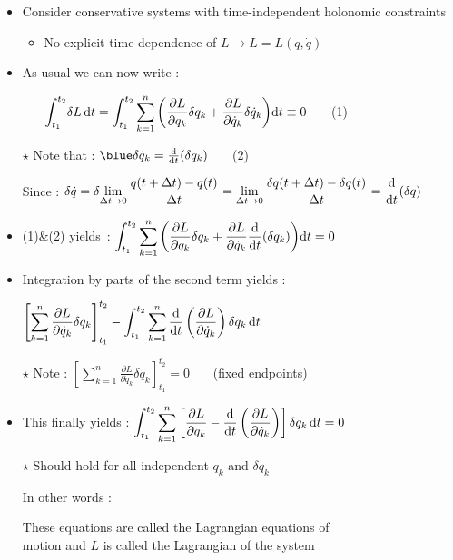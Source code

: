 \Tr
\begin{itemize}
\item Consider conservative systems with time-independent holonomic constraints
\begin{itemize}
\item No explicit time dependence of $L \rightarrow L=L(q,\dot{q})$
\end{itemize}
\item As usual we can now write :
\begin{itemize}
\item[] {\blue ${\displaystyle \int_{t_{1}}^{t_{2}}} \delta L \,{\rm d}t=
 {\displaystyle \int_{t_{1}}^{t_{2}} \sum_{k=1}^{n}
 \left( \frac{\partial L}{\partial q_{k}} \delta q_{k}
 + \frac{\partial L}{\partial \dot{q}_{k}} \delta\dot{q}_{k} \right)}
 {\rm d}t \equiv 0$} ~~~(1)
\end{itemize}
\item[$\star$] Note that : ${\blue \delta\dot{q}_{k}=\frac{{\rm d}}{{\rm d}t}(\delta q_{k})}$ ~~~(2)
\item[]  Since : $\delta \dot{q}=\delta {\displaystyle 
 \lim_{\Delta t \rightarrow 0} \frac{q(t+\Delta t)-q(t)}{\Delta t}=
 \lim_{\Delta t \rightarrow 0} \frac{\delta q(t+\Delta t)- \delta q(t)}{\Delta t}=
 \frac{{\rm d}}{{\rm d}t}(\delta q)}$
\item (1)\&(2) yields~:
 ${\displaystyle \int_{t_{1}}^{t_{2}} \sum_{k=1}^{n}
 \left( \frac{\partial L}{\partial q_{k}} \delta q_{k}
 + \frac{\partial L}{\partial \dot{q}_{k}}
 \frac{{\rm d}}{{\rm d}t}(\delta q_{k}) \right)} {\rm d}t=0$
\item Integration by parts of the second term yields :
\item[]
$\displaystyle \left[ \sum_{k=1}^{n}
 \frac{\partial L}{\partial\dot{q}_{k}}\delta q_{k} \right]_{t_{1}}^{t_{2}}
 - \int_{t_{1}}^{t_{2}} \sum_{k=1}^{n} \frac{{\rm d}}{{\rm d}t}
 \left( \frac{\partial L}{\partial\dot{q}_{k}} \right) \delta q_{k}\,{\rm d}t$
\item[$\star$] Note : 
$\displaystyle \left[ \sum_{k=1}^{n}
 \frac{\partial L}{\partial\dot{q}_{k}}\delta q_{k} \right]_{t_{1}}^{t_{2}}=0$
~~~(fixed endpoints)
\item This finally yields :
$\displaystyle \int_{t_{1}}^{t_{2}} \sum_{k=1}^{n}
 \left[ \frac{\partial L}{\partial q_{k}}
 - \frac{{\rm d}}{{\rm d}t}
 \left( \frac{\partial L}{\partial\dot{q}_{k}} \right) \right]
 \delta q_{k}\,{\rm d}t=0$
\item[$\star$] Should hold for all independent $q_{k}$ and $\delta q_{k}$
\item[] In other words :
\end{itemize}
%
\begin{center}
 {\red {}}
\end{center}
%
\begin{itemize}
\item[] These equations are called the {\blue Lagrangian equations of\\
        motion} and $L$ is called the {\blue Lagrangian} of the system
\end{itemize}

